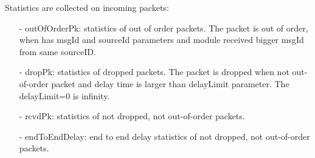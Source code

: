 Statistics are collected on incoming packets:
\begin{itemize}
\item[-] outOfOrderPk: statistics of out of order packets.
       The packet is out of order, when has msgId and sourceId parameters and module
       received bigger msgId from same sourceID.
\item[-] dropPk: statistics of dropped packets.
       The packet is dropped when not out-of-order packet and delay time is larger than
       delayLimit parameter. The delayLimit=0 is infinity.
\item[-] rcvdPk: statistics of not dropped, not out-of-order packets.
\item[-] endToEndDelay: end to end delay statistics of not dropped, not out-of-order packets.
\end{itemize}


